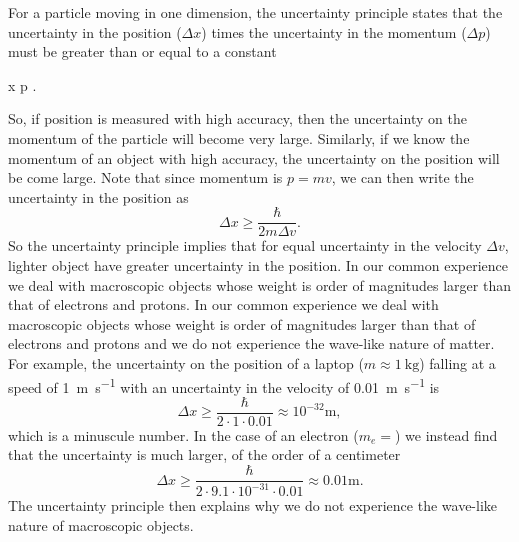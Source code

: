\documentclass[../Main/chem331-notes.tex]{subfiles}
\begin{document}
For a particle moving in one dimension, the uncertainty principle states that the uncertainty in the position ($\Delta x$) times the uncertainty in the momentum ($\Delta p$) must be greater than or equal to a constant
\begin{iequation}
\Delta x \Delta p \geq {}.
\end{iequation}
So, if position is measured with high accuracy, then the uncertainty on the momentum of the particle will become very large.
Similarly, if we know the momentum of an object with high accuracy, the uncertainty on the position will be come large.
Note that since momentum is $p = mv$, we can then write the uncertainty in the position as
\begin{equation}
\Delta x \geq \frac{\hbar}{2 m \Delta v}.
\end{equation}
So the uncertainty principle implies that for equal  uncertainty in the velocity $\Delta v$, lighter object have greater uncertainty in the position.
In our common experience we deal with macroscopic objects whose weight is order of magnitudes larger than that of electrons and protons.
In our common experience we deal with macroscopic objects whose weight is order of magnitudes larger than that of electrons and protons and we do not experience the wave-like nature of matter.
For example, the uncertainty on the position of a laptop ($m \approx \SI{1}{\kilo\gram}$) falling at a speed of \SI{1}{\meter\per\second} with an uncertainty in the velocity of  \SI{0.01}{\meter\per\second} is
\begin{equation}
\Delta x \geq \frac{\hbar}{2 \cdot 1 \cdot 0.01} \approx 10^{-32} \si{\meter},
\end{equation}
which is a minuscule number. In the case of an electron ($m_e = $) we instead find that the uncertainty is much larger, of the order of a centimeter
\begin{equation}
\Delta x \geq \frac{\hbar}{2 \cdot 9.1 \cdot 10^{-31} \cdot 0.01} \approx 0.01 \si{\meter}.
\end{equation}
The uncertainty principle then explains why we do not experience the wave-like nature of macroscopic objects.
\end{document}
